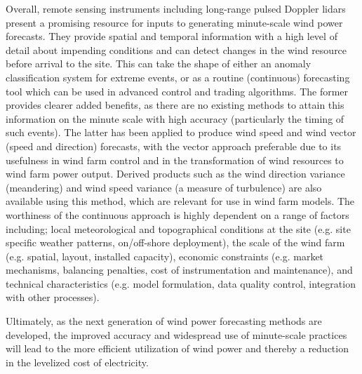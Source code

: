 Overall, remote sensing instruments including long-range pulsed Doppler lidars present a promising resource for inputs to generating minute-scale wind power forecasts. They provide spatial and temporal information with a high level of detail about impending conditions and can detect changes in the wind resource before arrival to the site. This can take the shape of either an anomaly classification system for extreme events, or as a routine (continuous) forecasting tool which can be used in advanced control and trading algorithms. The former provides clearer added benefits, as there are no existing methods to attain this information on the minute scale with high accuracy (particularly the timing of such events). The latter has been applied to produce wind speed and wind vector (speed and direction) forecasts, with the vector approach preferable due to its usefulness in wind farm control and in the transformation of wind resources to wind farm power output. Derived products such as the wind direction variance (meandering) and wind speed variance (a measure of turbulence) are also available using this method, which are relevant for use in wind farm models. The worthiness of the continuous approach is highly dependent on a range of factors including; local meteorological and topographical conditions at the site (e.g. site specific weather patterns, on/off-shore deployment), the scale of the wind farm (e.g. spatial, layout, installed capacity), economic constraints (e.g. market mechanisms, balancing penalties, cost of instrumentation and maintenance), and technical characteristics (e.g. model formulation, data quality control, integration with other processes). 

Ultimately, as the next generation of wind power forecasting methods are developed, the improved accuracy and widespread use of minute-scale practices will lead to the more efficient utilization of wind power and thereby a reduction in the levelized cost of electricity.

